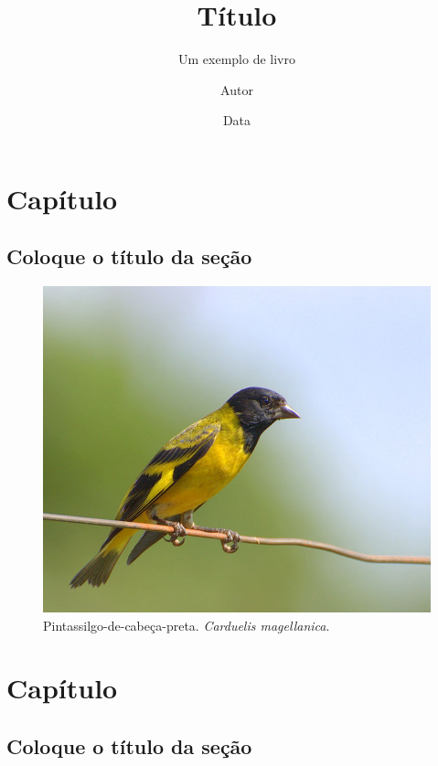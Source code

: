 \documentclass[a4paper,numbers=noenddot,DIV=calc]{scrbook} %
\title{Título}
\subtitle{Um exemplo de livro} %
\author{Autor}
\date{Data}
\begin{document}
\frenchspacing

\maketitle

\frontmatter

\tableofcontents %
\listoffigures %


\mainmatter


\chapter{Capítulo}


\section{Coloque o título da seção}
\lipsum[1-5]


\begin{figure}
\centering
\includegraphics[width=0.5\linewidth]{pintassilgo}
\caption{Pintassilgo-de-cabeça-preta. \textit{Carduelis magellanica}.}
\label{pintassilgo}
\end{figure}


\chapter{Capítulo}

\section{Coloque o título da seção}
\lipsum[1]
\end{document}
